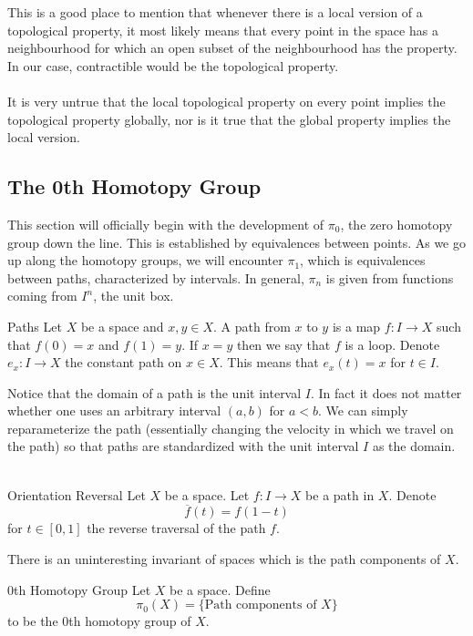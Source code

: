 \documentclass[a4paper]{article}
\begin{document}
This is a good place to mention that whenever there is a local version of a topological property, it most likely means that every point in the space has a neighbourhood for which an open subset of the neighbourhood has the property. In our case, contractible would be the topological property. \\~\\

It is very untrue that the local topological property on every point implies the topological property globally, nor is it true that the global property implies the local version. 

\subsection{The 0th Homotopy Group}
This section will officially begin with the development of $\pi_0$, the zero homotopy group down the line. This is established by equivalences between points. As we go up along the homotopy groups, we will encounter $\pi_1$, which is equivalences between paths, characterized by intervals. In general, $\pi_n$ is given from functions coming from $I^n$, the unit box. 

\begin{defn}{Paths}{} Let $X$ be a space and $x,y\in X$. A path from $x$ to $y$ is a map $f:I\to X$ such that $f(0)=x$ and $f(1)=y$. If $x=y$ then we say that $f$ is a loop. Denote $e_x:I\to X$ the constant path on $x\in X$. This means that $e_x(t)=x$ for $t\in I$. 
\end{defn}

Notice that the domain of a path is the unit interval $I$. In fact it does not matter whether one uses an arbitrary interval $(a,b)$ for $a<b$. We can simply reparameterize the path (essentially changing the velocity in which we travel on the path) so that paths are standardized with the unit interval $I$ as the domain. \\~\\

\begin{defn}{Orientation Reversal}{} Let $X$ be a space. Let $f:I\to X$ be a path in $X$. Denote $$\overline{f}(t)=f(1-t)$$ for $t\in[0,1]$ the reverse traversal of the path $f$. 
\end{defn}

There is an uninteresting invariant of spaces which is the path components of $X$. 

\begin{defn}{0th Homotopy Group}{} Let $X$ be a space. Define $$\pi_0(X)=\{\text{Path components of }X\}$$ to be the $0$th homotopy group of $X$. 
\end{defn}
\end{document}
